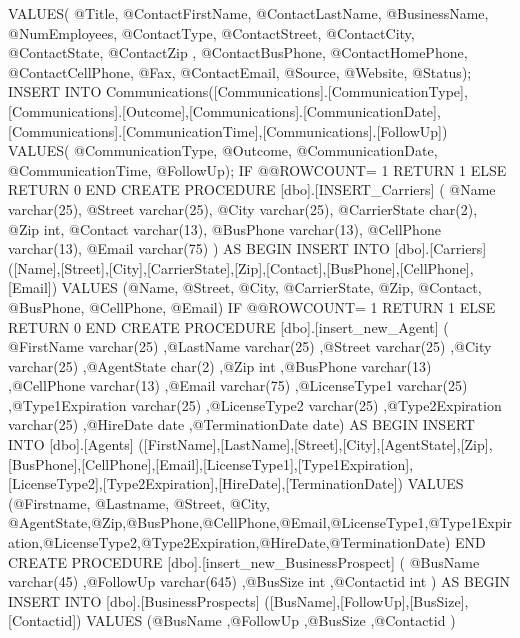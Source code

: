 	VALUES(			 @Title,	        @ContactFirstName,	   @ContactLastName,     @BusinessName,	           @NumEmployees,            @ContactType,            @ContactStreet,     @ContactCity,     @ContactState,            @ContactZip ,    @ContactBusPhone,     @ContactHomePhone,     @ContactCellPhone,     @Fax,            @ContactEmail,     @Source,            @Website,            @Status);        
INSERT INTO	Communications([Communications].[CommunicationType],[Communications].[Outcome],[Communications].[CommunicationDate],[Communications].[CommunicationTime],[Communications].[FollowUp])	
	VALUES(				   @CommunicationType,                  @Outcome,                  @CommunicationDate,                  @CommunicationTime,                  @FollowUp);             			
			IF @@ROWCOUNT= 1
				RETURN 1
			ELSE
				RETURN 0
END
CREATE PROCEDURE [dbo].[INSERT_Carriers]
(	@Name varchar(25),	
	@Street varchar(25),
	@City varchar(25),
	@CarrierState char(2),
	@Zip int,
	@Contact varchar(13),
	@BusPhone varchar(13),
	@CellPhone varchar(13),
	@Email varchar(75)
) AS BEGIN
INSERT INTO [dbo].[Carriers]
			([Name],[Street],[City],[CarrierState],[Zip],[Contact],[BusPhone],[CellPhone],[Email])
VALUES
			(@Name, @Street, @City, @CarrierState, @Zip, @Contact, @BusPhone, @CellPhone, @Email)
			IF @@ROWCOUNT= 1
				RETURN 1
			ELSE
				RETURN 0
END
CREATE PROCEDURE [dbo].[insert_new_Agent]
(
		    @FirstName varchar(25)
           ,@LastName varchar(25)
           ,@Street varchar(25)
           ,@City varchar(25)
           ,@AgentState char(2)
           ,@Zip int
           ,@BusPhone varchar(13)
           ,@CellPhone varchar(13)
           ,@Email varchar(75)
           ,@LicenseType1 varchar(25)
           ,@Type1Expiration varchar(25)
           ,@LicenseType2 varchar(25)
           ,@Type2Expiration varchar(25)
           ,@HireDate date
           ,@TerminationDate date) AS BEGIN 
	INSERT INTO [dbo].[Agents]
			([FirstName],[LastName],[Street],[City],[AgentState],[Zip],[BusPhone],[CellPhone],[Email],[LicenseType1],[Type1Expiration], [LicenseType2],[Type2Expiration],[HireDate],[TerminationDate])
VALUES
			(@Firstname, @Lastname, @Street, @City, @AgentState,@Zip,@BusPhone,@CellPhone,@Email,@LicenseType1,@Type1Expiration,@LicenseType2,@Type2Expiration,@HireDate,@TerminationDate)
END
CREATE PROCEDURE [dbo].[insert_new_BusinessProspect]
(
@BusName varchar(45)
,@FollowUp varchar(645)
,@BusSize int
,@Contactid int
) AS BEGIN
INSERT INTO [dbo].[BusinessProspects]
           ([BusName],[FollowUp],[BusSize],[Contactid])
     VALUES
           (@BusName ,@FollowUp ,@BusSize ,@Contactid )
